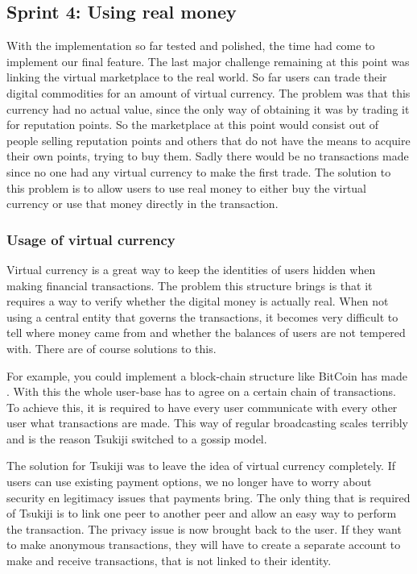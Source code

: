 \subsection{Sprint 4: Using real money}
With the implementation so far tested and polished, the time had come to implement our final feature. 
The last major challenge remaining at this point was linking the virtual marketplace to the real world.
So far users can trade their digital commodities for an amount of virtual currency.
The problem was that this currency had no actual value, since the only way of obtaining it was by trading it for reputation points.
So the marketplace at this point would consist out of people selling reputation points and others that do not have the means to acquire their own points, trying to buy them.
Sadly there would be no transactions made since no one had any virtual currency to make the first trade.
The solution to this problem is to allow users to use real money to either buy the virtual currency or use that money directly in the transaction.

\subsubsection{Usage of virtual currency}
Virtual currency is a great way to keep the identities of users hidden when making financial transactions. 
The problem this structure brings is that it requires a way to verify whether the digital money is actually real. 
When not using a central entity that governs the transactions, it becomes very difficult to tell where money came from and whether the balances of users are not tempered with.
There are of course solutions to this.

For example, you could implement a block-chain structure like BitCoin has made \cite{bitcoin}.
With this the whole user-base has to agree on a certain chain of transactions.
To achieve this, it is required to have every user communicate with every other user what transactions are made.
This way of regular broadcasting scales terribly and is the reason Tsukiji switched to a gossip model.

The solution for Tsukiji was to leave the idea of virtual currency completely. 
If users can use existing payment options, we no longer have to worry about security en legitimacy issues that payments bring.
The only thing that is required of Tsukiji is to link one peer to another peer and allow an easy way to perform the transaction.
The privacy issue is now brought back to the user. 
If they want to make anonymous transactions, they will have to create a separate account to make and receive transactions, that is not linked to their identity. 

